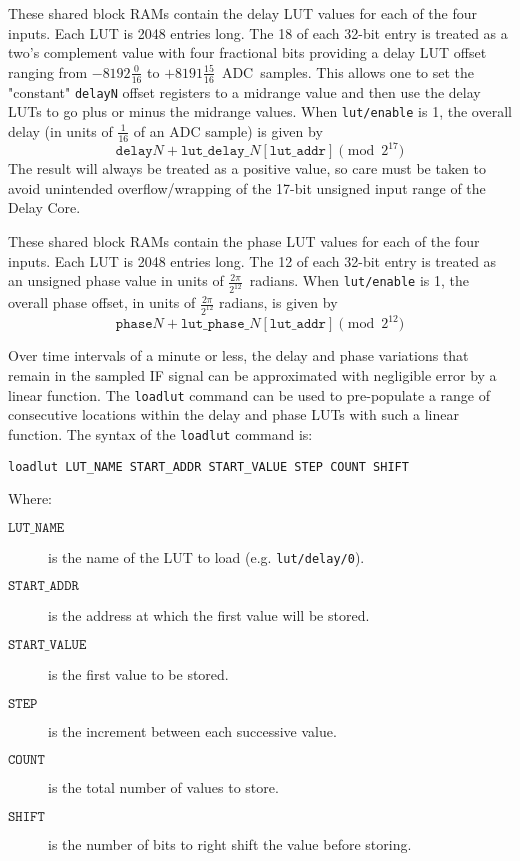 \documentclass[12pt]{article}
\begin{document}
\begin{description}
 These shared block RAMs contain the delay LUT values for
each of the four inputs.  Each LUT is 2048 entries long.  The 18 \LSbs of each
32-bit entry is treated as a two's complement value with four fractional bits
providing a delay LUT offset ranging from $-8192\frac{0}{16}$ to
$+8191\frac{15}{16}$~ADC~samples.  This allows one to set the "constant"
\verb|delayN| offset registers to a midrange value and then use the delay LUTs
to go plus or minus the midrange values.  When \verb|lut/enable| is 1, the
overall delay (in units of $\frac{1}{16}$ of an ADC sample) is given by
\begin{equation*}
\mathtt{delay}N + \mathtt{lut\_delay\_}N\mathtt{[lut\_addr]} \pmod{2^{17}}
\end{equation*}
The result will always be treated as a positive value, so care must be taken to
avoid unintended overflow/wrapping of the 17-bit unsigned input range of the
Delay Core.

 These shared block RAMs contain the phase LUT values for
each of the four inputs.  Each LUT is 2048 entries long.  The 12 \LSbs of each
32-bit entry is treated as an unsigned phase value in units of $\frac{2
\pi}{2^{12}}$~radians.  When \verb|lut/enable| is 1, the overall phase offset,
in units of $\frac{2 \pi}{2^{12}}$ radians, is given by
\begin{equation*}
\mathtt{phase}N + \mathtt{lut\_phase\_}N\mathtt{[lut\_addr]} \pmod{2^{12}}
\end{equation*}

\filbreak
{} Over time intervals of a minute or less, the delay and phase
variations that remain in the sampled IF signal can be approximated with
negligible error by a linear function.  The \verb|loadlut| command can be used
to pre-populate a range of consecutive locations within the delay and phase
LUTs with such a linear function.  The syntax of the \verb|loadlut| command is:
\begin{verbatim}
loadlut LUT_NAME START_ADDR START_VALUE STEP COUNT SHIFT
\end{verbatim}
Where:
\begin{description}
\item[$\mathtt{LUT\_NAME}$] is the name of the LUT to load (e.g.
\verb|lut/delay/0|).
\item[$\mathtt{START\_ADDR}$] is the address at which the first value will be
stored.
\item[$\mathtt{START\_VALUE}$] is the first value to be stored.
\item[$\mathtt{STEP}$] is the increment between each successive value.
\item[$\mathtt{COUNT}$] is the total number of values to store.
\item[$\mathtt{SHIFT}$] is the number of bits to right shift the value before
storing.
\end{description}


\end{description}
\end{document}
